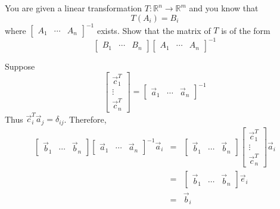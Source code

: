 \documentclass{ximera}
\begin{document}
\begin{problem}\label{prb:10.92} You are given a linear transformation $T:\mathbb{R}^{n}\rightarrow
\mathbb{R}^{m}$ and you know that
\begin{equation*}
T\left(A_{i}\right)=B_{i}
\end{equation*}
where $\left[
\begin{array}{ccc}
A_{1} & \cdots & A_{n}
\end{array}
\right] ^{-1}$ exists. Show that the matrix of $T$ is of the form
\begin{equation*}
\left[
\begin{array}{ccc}
B_{1} & \cdots & B_{n}
\end{array}
\right] \left[
\begin{array}{ccc}
A_{1} & \cdots & A_{n}
\end{array}
\right] ^{-1}
\end{equation*}
\begin{hint}
Suppose
\[
\left[
\begin{array}{c}
\vec{c}_{1}^{T} \\
\vdots \\
\vec{c}_{n}^{T}
\end{array}
\right] =\left[
\begin{array}{ccc}
\vec{a}_{1} & \cdots & \vec{a}_{n}
\end{array}
\right]^{-1}
\]
Thus $\vec{c}_{i}^{T}\vec{a}_{j}=\delta _{ij}$. Therefore,
\begin{eqnarray*}
\left[
\begin{array}{ccc}
\vec{b}_{1} & \cdots & \vec{b}_{n}
\end{array}
\right] \left[
\begin{array}{ccc}
\vec{a}_{1} & \cdots & \vec{a}_{n}
\end{array}
\right] ^{-1}\vec{a}_{i} &=&
\left[
\begin{array}{ccc}
\vec{b}_{1} & \cdots & \vec{b}_{n}
\end{array}
\right] \left[
\begin{array}{c}
\vec{c}_{1}^{T} \\
\vdots \\
\vec{c}_{n}^{T}
\end{array}
\right] \vec{a}_{i} \\
&=&\left[
\begin{array}{ccc}
\vec{b}_{1} & \cdots & \vec{b}_{n}
\end{array}
\right] \vec{e}_{i} \\
&=&\vec{b}_{i}
\end{eqnarray*}

\end{hint}
\end{problem}
\end{document}
